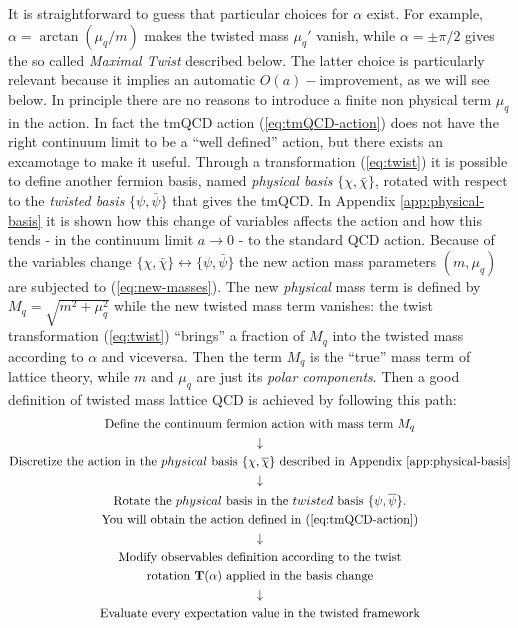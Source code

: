 \documentclass[english, LaM, oneside, noexaminfo]{sapthesis}
\newcommand{\oait}{$O(a)-$improvement}
\begin{document}
It is straightforward to guess that particular choices for $\alpha$ exist. 
For example, $\alpha = \arctan (\mu_q/m)$ makes the twisted mass $\mu_q'$ vanish, while $\alpha = \pm \pi/2$ gives the so called {\it Maximal Twist} described below. 
The latter choice is particularly relevant because it implies an automatic \oait, as we will see below.
\newline
In principle there are no reasons to introduce a finite non physical term $\mu_q$ in the action.
In fact the tmQCD action (\ref{eq:tmQCD-action}) does not have the right continuum limit to be a ``well defined'' action, but there exists an excamotage to make it useful.
Through a transformation (\ref{eq:twist}) it is possible to define another fermion basis, named \textit{physical basis} $\{\chi, \bar\chi\}$, rotated with respect to the \textit{twisted basis} $\{\psi, \bar\psi\}$ that gives the tmQCD.
In Appendix \ref{app:physical-basis} it is shown how this change of variables affects the action and how this tends - in the continuum limit $a\rightarrow 0$ - to the standard QCD action.
Because of the variables change $\{\chi, \bar\chi\} \leftrightarrow \{\psi, \bar\psi\}$ the new action mass parameters $(m,\mu_q)$ are subjected to (\ref{eq:new-masses}).
The new \textit{physical} mass term is defined by $M_q = \sqrt{m^2 + \mu_q ^2}$ while the new twisted mass term vanishes: the twist transformation (\ref{eq:twist}) ``brings'' a fraction of $M_q$ into the twisted mass according to $\alpha$ and viceversa.
Then the term $M_q$ is the ``true'' mass term of lattice theory, while $m$ and $\mu_q$ are just its \textit{polar components}.
Then a good definition of twisted mass lattice QCD is achieved by following this path:
\begin{equation*}
    \begin{gathered}
        \text{Define the continuum fermion action with mass term } M_q \\
        \downarrow \\
        \text{Discretize the action in the } physical \text{ basis } \{\chi,\overline{\chi}\} \text{ described in Appendix \ref{app:physical-basis}} \\
        \downarrow  \\
        \text{Rotate the } physical \text{ basis in the } twisted \text{ basis } \{\psi,\overline{\psi}\} \text{.} \\
        \text{You will obtain the action defined in (\ref{eq:tmQCD-action})} \\
        \downarrow \\
        \text{Modify observables definition according to the twist}\\
        \text{rotation } \mathbf{T}(\alpha)  \text{ applied in the basis change}\\
        \downarrow \\
        \text{Evaluate every expectation value in the twisted framework}
    \end{gathered}
\end{equation*}
\end{document}
